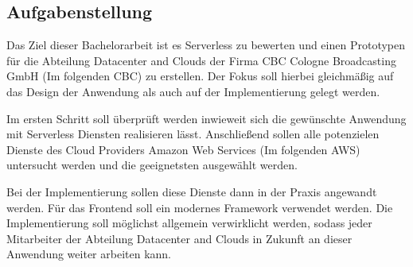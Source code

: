 \subsection{Aufgabenstellung}

Das Ziel dieser Bachelorarbeit ist es Serverless zu bewerten und einen Prototypen für
die Abteilung Datacenter and Clouds der Firma CBC Cologne Broadcasting GmbH (Im folgenden \dq CBC\dq) zu erstellen.
Der Fokus soll hierbei gleichmäßig auf das Design der Anwendung als auch auf der Implementierung gelegt werden.

Im ersten Schritt soll überprüft werden inwieweit sich die gewünschte Anwendung mit Serverless Diensten realisieren lässt.
Anschließend sollen alle potenzielen Dienste des Cloud Providers Amazon Web Services (Im folgenden \dq AWS\dq) untersucht werden und die geeignetsten
ausgewählt werden.

Bei der Implementierung sollen diese Dienste dann in der Praxis angewandt werden. Für das Frontend soll ein modernes Framework verwendet werden.
Die Implementierung soll möglichst allgemein verwirklicht werden, sodass jeder Mitarbeiter der Abteilung Datacenter and Clouds in Zukunft an dieser
Anwendung weiter arbeiten kann.

